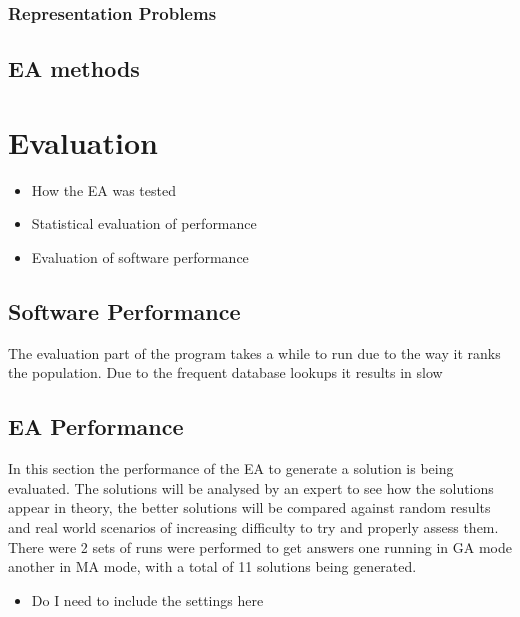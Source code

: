 \documentclass[a4paper]{article}
\begin{document}
\subsubsection{Representation Problems}

\subsection{EA methods}


\section{Evaluation}
\begin{itemize}
	\item How the EA was tested
	\item Statistical evaluation of performance
	\item Evaluation of software performance
\end{itemize}
\subsection{Software Performance}
The evaluation part of the program takes a while to run due to the way it ranks the population.
Due to the frequent database lookups it results in slow
\subsection{EA Performance}
In this section the performance of the EA to generate a solution is being evaluated.
The solutions will be analysed by an expert to see how the solutions appear in theory, the better solutions will be compared against random results and real world scenarios of increasing difficulty to try and properly assess them.
There were 2 sets of runs were performed to get answers one running in GA mode another in MA mode, with a total of 11 solutions being generated.
\begin{itemize}
	\item Do I need to include the settings here
\end{itemize}
\end{document}
